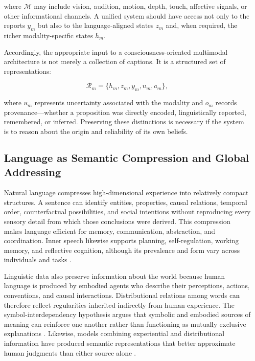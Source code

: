 where $\mathcal{M}$ may include vision, audition, motion, depth, touch, affective signals, or other informational channels. A unified system should have access not only to the reports $y_m$ but also to the language-aligned states $z_m$ and, when required, the richer modality-specific states $h_m$.

Accordingly, the appropriate input to a consciousness-oriented multimodal architecture is not merely a collection of captions. It is a structured set of representations:

\begin{equation}
\mathcal{R}_{m}
=
\{h_m,z_m,y_m,u_m,o_m\},
\label{eq:modality-record}
\end{equation}

where $u_m$ represents uncertainty associated with the modality and $o_m$ records provenance---whether a proposition was directly encoded, linguistically reported, remembered, or inferred. Preserving these distinctions is necessary if the system is to reason about the origin and reliability of its own beliefs.

\subsection{Language as Semantic Compression and Global Addressing}
\label{subsec:semantic-compression}

Natural language compresses high-dimensional experience into relatively compact structures. A sentence can identify entities, properties, causal relations, temporal order, counterfactual possibilities, and social intentions without reproducing every sensory detail from which those conclusions were derived. This compression makes language efficient for memory, communication, abstraction, and coordination. Inner speech likewise supports planning, self-regulation, working memory, and reflective cognition, although its prevalence and form vary across individuals and tasks \cite{aldersonday2015inner}.

Linguistic data also preserve information about the world because human language is produced by embodied agents who describe their perceptions, actions, conventions, and causal interactions. Distributional relations among words can therefore reflect regularities inherited indirectly from human experience. The symbol-interdependency hypothesis argues that symbolic and embodied sources of meaning can reinforce one another rather than functioning as mutually exclusive explanations \cite{louwerse2011symbol}. Likewise, models combining experiential and distributional information have produced semantic representations that better approximate human judgments than either source alone \cite{andrews2009integrating}.

